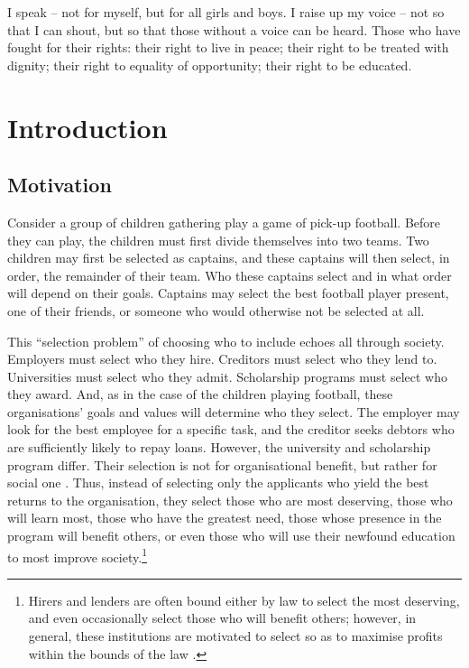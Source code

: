 \begin{savequote}[8cm]
    I speak – not for myself, but for all girls and boys. I raise up my voice – not so that I can shout, but so that those without a voice can be heard. Those who have fought for their rights: their right to live in peace; their right to be treated with dignity; their right to equality of opportunity; their right to be educated.
\end{savequote}

\chapter{\label{ch:intro}Introduction} 

\minitoc

\section{Motivation}

Consider a group of children gathering play a game of pick-up football. Before they can play, the children must first divide themselves into two teams. Two children may first be selected as captains, and these captains will then select, in order, the remainder of their team. Who these captains select and in what order will depend on their goals. Captains may select the best football player present, one of their friends, or someone who would otherwise not be selected at all.

This ``selection problem'' of choosing who to include echoes all through society. Employers must select who they hire. Creditors must select who they lend to. Universities must select who they admit. Scholarship programs must select who they award. And, as in the case of the children playing football, these organisations' goals and values will determine who they select. The employer may look for the best employee for a specific task, and the creditor seeks debtors who are sufficiently likely to repay loans. However, the university and scholarship program differ. Their selection is not for organisational benefit, but rather for social one \cite{Warikoo_2019}. Thus, instead of selecting only the applicants who yield the best returns to the organisation, they select those who are most deserving, those who will learn most, those who have the greatest need, those whose presence in the program will benefit others, or even those who will use their newfound education to most improve society.\footnote{Hirers and lenders are often bound either by law to select the most deserving, and even occasionally select those who will benefit others; however, in general, these institutions are motivated to select so as to maximise profits within the bounds of the law \cite{schmidt1998validity}.}


